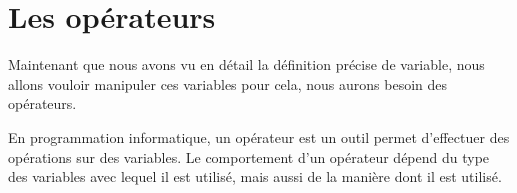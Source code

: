 \vfill

\section*{Les opérateurs}

Maintenant que nous avons vu en détail la définition précise de variable, nous allons vouloir manipuler ces variables pour cela, nous aurons besoin des opérateurs.\\

\begin{Definition}[Opérateur]
    En programmation informatique, un opérateur est un outil permet d'effectuer des opérations sur des variables. 
    Le comportement d'un opérateur dépend du type des variables avec lequel il est utilisé, mais aussi de la manière dont il est utilisé.
\end{Definition}

